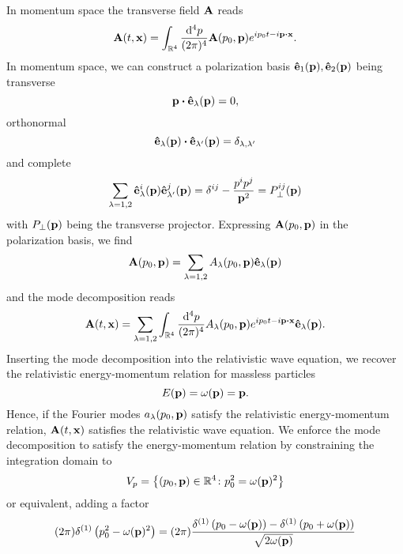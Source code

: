 In momentum space the transverse field $\vb{A}$ reads
\begin{equation}
	\vb{A}(t,\vb{x})
	=
	\int_{\mathbb{R}^4}\frac{\dd[4]{p}}{(2\pi)^4}
	\vb{A}(p_0,\vb{p})
	e^{ip_0t-i\vb{p}\vdot\vb{x}}
	.
\end{equation}
In momentum space, we can construct a polarization basis $\vu{e}_1(\vb{p}),\vu{e}_2(\vb{p})$ being transverse
\begin{equation}
	\vb{p}\vdot\vu{e}_\lambda(\vb{p})
	=
	0
	,
\end{equation}
orthonormal
\begin{equation}
	\vu{e}_\lambda(\vb{p})
	\vdot
	\vu{e}_{\lambda^\prime}(\vb{p})
	=
	\delta_{\lambda,\lambda^\prime}
\end{equation}
and complete
\begin{equation}
	\sum_{\lambda=1,2}
	\vu{e}_\lambda^i(\vb{p})
	\vu{e}_{\lambda^\prime}^j(\vb{p})
	=
	\delta^{ij}
	-
	\frac{p^ip^j}{\vb{p}^2}
	=
	P_\perp^{ij}(\vb{p})
\end{equation}
with $P_\perp(\vb{p})$ being the transverse projector.
Expressing $\vb{A}(p_0,\vb{p})$ in the polarization basis, we find
\begin{equation}
	\vb{A}(p_0,\vb{p})
	=
	\sum_{\lambda=1,2}
	A_\lambda(p_0,\vb{p})
	\vu{e}_\lambda(\vb{p})
\end{equation}
and the mode decomposition reads
\begin{equation}
	\vb{A}(t,\vb{x})
	=
	\sum_{\lambda=1,2}
	\int_{\mathbb{R}^4}\frac{\dd[4]{p}}{(2\pi)^4}
	A_\lambda(p_0,\vb{p})
	e^{ip_0t-i\vb{p}\vdot\vb{x}}
	\vu{e}_\lambda(\vb{p})
	.
\end{equation}
Inserting the mode decomposition into the relativistic wave equation, we recover the relativistic energy-momentum relation for massless particles
\begin{equation}
	E(\vb{p})
	=
	\omega(\vb{p})
	=
	\vb{p}
	.
\end{equation}
Hence, if the Fourier modes $a_\lambda(p_0,\vb{p})$ satisfy the relativistic energy-momentum relation, $\vb{A}(t,\vb{x})$ satisfies the relativistic wave equation.
We enforce the mode decomposition to satisfy the energy-momentum relation by constraining the integration domain to
\begin{equation}
	V_p
	=
	\left\{
		(p_0,\vb{p})\in\mathbb{R}^4
		\colon
		p_0^2
		=
		\omega(\vb{p})^2
	\right\}
\end{equation}
or equivalent, adding a factor
\begin{equation}
	(2\pi)
	\delta^{(1)}\left(p_0^2-\omega(\vb{p})^2\right)
	=
	(2\pi)
	\frac{
		\delta^{(1)}\left(p_0-\omega(\vb{p})\right)
		-
		\delta^{(1)}\left(p_0+\omega(\vb{p})\right)
	}{\sqrt{2\omega(\vb{p})}}
\end{equation}
